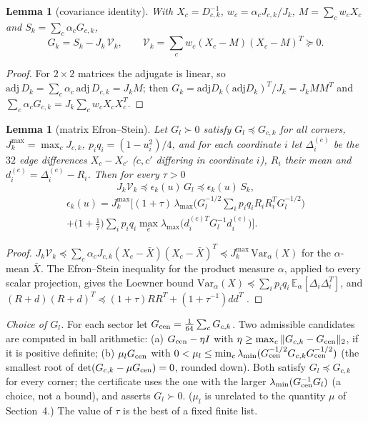 \documentclass[11pt]{article}
\newtheorem{lemma}[theorem]{Lemma}
\theoremstyle{remark}
\begin{document}
\begin{lemma}[covariance identity]\label{lem:cov}
With $X_c=D_{c,k}^{-1}$, $w_c=\alpha_cJ_{c,k}/J_k$, $M=\sum_cw_cX_c$ and $S_k=\sum_c\alpha_cG_{c,k}$,
\[
G_k=S_k-J_k\,\mathcal V_k,\qquad \mathcal V_k=\sum_cw_c(X_c-M)(X_c-M)^T\succeq0 .
\]
\end{lemma}
\begin{proof}
For $2\times2$ matrices the adjugate is linear, so $\mathrm{adj}\,D_k=\sum_c\alpha_c\,\mathrm{adj}\,D_{c,k}=J_k M$;
then $G_k=\mathrm{adj}D_k(\mathrm{adj}D_k)^T/J_k=J_kMM^T$ and $\sum_c\alpha_cG_{c,k}=J_k\sum_cw_cX_cX_c^T$.
\end{proof}

\begin{lemma}[matrix Efron--Stein]\label{lem:es}
Let $G_l\succ0$ satisfy $G_l\preceq G_{c,k}$ for all corners, $J^{\max}_k=\max_cJ_{c,k}$, $p_iq_i=(1-u_i^2)/4$, and for
each coordinate $i$ let $\Delta_i^{(e)}$ be the $32$ edge differences $X_c-X_{c'}$ ($c,c'$ differing in coordinate $i$),
$R_i$ their mean and $d^{(e)}_i=\Delta^{(e)}_i-R_i$. Then for every $\tau>0$
\[
J_k\mathcal V_k\preceq \epsilon_k(u)\,G_l\preceq\epsilon_k(u)\,S_k,
\]
\begin{multline*}
\epsilon_k(u)=J^{\max}_k\Big[(1+\tau)\,\lambda_{\max}\Big(G_l^{-1/2}\sum_ip_iq_iR_iR_i^TG_l^{-1/2}\Big)\\
+\big(1+\tfrac1\tau\big)\sum_ip_iq_i\max_e\lambda_{\max}\big(d_i^{(e)T}G_l^{-1}d_i^{(e)}\big)\Big].
\end{multline*}
\end{lemma}
\begin{proof}
$J_k\mathcal V_k\preceq\sum_c\alpha_cJ_{c,k}(X_c-\bar X)(X_c-\bar X)^T\preceq J^{\max}_k\,\mathrm{Var}_\alpha(X)$ for the
$\alpha$-mean $\bar X$. The Efron--Stein inequality for the product measure $\alpha$, applied to every scalar projection,
gives the Loewner bound $\mathrm{Var}_\alpha(X)\preceq\sum_ip_iq_i\,\mathbb E_\alpha[\Delta_i\Delta_i^T]$, and
$(R+d)(R+d)^T\preceq(1+\tau)RR^T+(1+\tau^{-1})dd^T$ \cite{es}.
\end{proof}

\emph{Choice of $G_l$.} For each sector let $G_{\rm cen}=\frac1{64}\sum_cG_{c,k}$. Two admissible candidates are computed
in ball arithmetic: (a) $G_{\rm cen}-\eta I$ with $\eta\ge\max_c\|G_{c,k}-G_{\rm cen}\|_2$, if it is positive definite;
(b) $\mu_lG_{\rm cen}$ with $0<\mu_l\le\min_c\lambda_{\min}(G_{\rm cen}^{-1/2}G_{c,k}G_{\rm cen}^{-1/2})$ (the smallest root
of $\det(G_{c,k}-\mu G_{\rm cen})=0$, rounded down). Both satisfy $G_l\preceq G_{c,k}$ for every corner; the certificate
uses the one with the larger $\lambda_{\min}(G_{\rm cen}^{-1}G_l)$ (a choice, not a bound), and asserts $G_l\succ0$.
($\mu_l$ is unrelated to the quantity $\mu$ of Section~4.) The value of $\tau$ is the best of a fixed finite list.
\end{document}
